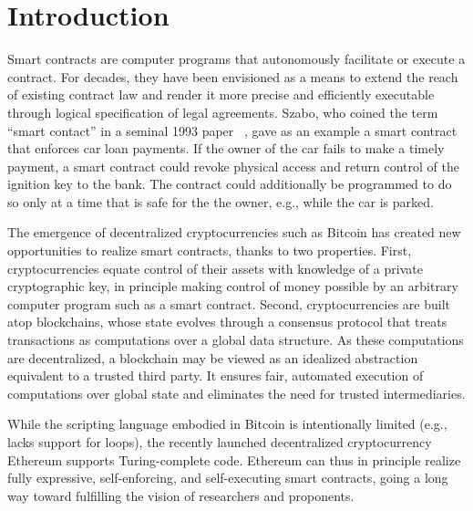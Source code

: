 
\section{Introduction}

Smart contracts are computer programs that autonomously facilitate or execute a contract. For decades, they have been envisioned as a means to extend the reach of existing contract law and render it more precise and efficiently executable through logical specification of legal agreements. Szabo, who coined the term ``smart contact'' in a seminal 1993 paper~\cite{} , gave as an example a smart contract that enforces car loan payments. If the owner of the car fails to make a timely payment, a smart contract could revoke physical access and return control of the ignition key to the bank. The contract could additionally be programmed to do so only at a time that is safe for the the owner, e.g., while the car is parked.

The emergence of decentralized cryptocurrencies such as Bitcoin has created new opportunities to realize smart contracts, thanks to two properties. First, cryptocurrencies equate control of their assets with knowledge of a private cryptographic key, in principle making control of money possible by an arbitrary computer program such as a smart contract. Second, cryptocurrencies are built atop blockchains, whose state evolves through a consensus protocol that treats transactions as computations over a global data structure. As these computations are decentralized, a blockchain may be viewed as an idealized abstraction equivalent to a trusted third party. It ensures fair, automated execution of computations over global state and eliminates the need for trusted intermediaries. 

While the scripting language embodied in Bitcoin is intentionally limited (e.g., lacks support for loops), the recently launched decentralized cryptocurrency Ethereum supports Turing-complete code. Ethereum can thus in principle realize fully expressive, self-enforcing, and self-executing smart contracts, going a long way toward fulfilling the vision of researchers and proponents.  

